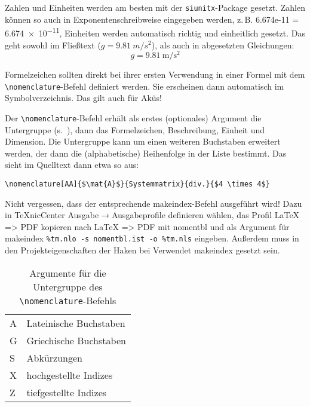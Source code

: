 Zahlen und Einheiten werden am besten mit der \texttt{siunitx}-Package gesetzt.
Zahlen können so auch in Exponentenschreibweise eingegeben werden, z.\,B. 6.674e-11 = \num{6.674e-11}, Einheiten werden automatisch richtig und einheitlich gesetzt.
Das geht sowohl im Fließtext ($g=\SI{9.81}{m/s^2}$), als auch in abgesetzten Gleichungen:
\begin{equation}
	g = \SI{9.81}{\metre\per\second\squared}
	\label{eq:g}
\end{equation}

Formelzeichen sollten direkt bei ihrer ersten Verwendung in einer Formel mit dem \texttt{\textbackslash{}nomenclature}-Befehl definiert werden.
Sie erscheinen dann automatisch im Symbolverzeichnis.
Das gilt auch für Aküs!

Der \texttt{\textbackslash{}nomenclature}-Befehl erhält als erstes (optionales) Argument die Untergruppe (s.~), dann das Formelzeichen, Beschreibung, Einheit und Dimension.
Die Untergruppe kann um einen weiteren Buchstaben erweitert werden, der dann die (alphabetische) Reihenfolge in der Liste bestimmt.
Das sieht im Quelltext dann etwa so aus:
\begin{verbatim}
\nomenclature[AA]{$\mat{A}$}{Systemmatrix}{div.}{$4 \times 4$}
\end{verbatim}

Nicht vergessen, dass der entsprechende makeindex-Befehl ausgeführt wird!
Dazu in TeXnicCenter Ausgabe$\rightarrow$Ausgabeprofile definieren wählen, das Profil LaTeX => PDF kopieren nach LaTeX => PDF mit nomentbl und als Argument für makeindex \texttt{\%tm.nlo -s nomentbl.ist -o \%tm.nls} eingeben.
Außerdem muss in den Projekteigenschaften der Haken bei \glqq{}Verwendet makeindex\grqq{} gesetzt sein.

\begin{table}[htbp]
	\centering
		\begin{tabular}{ll}
			\hline
			A & Lateinische Buchstaben \\
			G & Griechische Buchstaben \\
			S & Abkürzungen \\
			X & hochgestellte Indizes \\
			Z & tiefgestellte Indizes \\
			\hline
		\end{tabular}
	\caption{Argumente für die Untergruppe des \texttt{\textbackslash{}nomenclature}-Befehls}
	\label{tab:nomenclArgumente}
\end{table}


